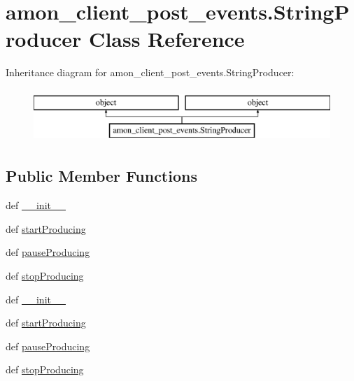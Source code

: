 \hypertarget{classamon__client__post__events_1_1_string_producer}{\section{amon\-\_\-client\-\_\-post\-\_\-events.\-String\-Producer Class Reference}
\label{classamon__client__post__events_1_1_string_producer}
}
Inheritance diagram for amon\-\_\-client\-\_\-post\-\_\-events.\-String\-Producer\-:\begin{figure}[H]
\begin{center}
\leavevmode
\includegraphics[height=2.000000cm]{d5/d48/classamon__client__post__events_1_1_string_producer}
\end{center}
\end{figure}
\subsection*{Public Member Functions}
\begin{DoxyCompactItemize}
\item 
def \hyperlink{classamon__client__post__events_1_1_string_producer_ac2908908965317f0faa0c7f362c1a209}{\-\_\-\-\_\-init\-\_\-\-\_\-}
\item 
def \hyperlink{classamon__client__post__events_1_1_string_producer_a48cf3f30df73ed98063f87edd0b65d31}{start\-Producing}
\item 
def \hyperlink{classamon__client__post__events_1_1_string_producer_aea46523df84eb5fdf9e002056bde4148}{pause\-Producing}
\item 
def \hyperlink{classamon__client__post__events_1_1_string_producer_ac21b83f98560eb605b6afa71d5ffb438}{stop\-Producing}
\item 
def \hyperlink{classamon__client__post__events_1_1_string_producer_ac2908908965317f0faa0c7f362c1a209}{\-\_\-\-\_\-init\-\_\-\-\_\-}
\item 
def \hyperlink{classamon__client__post__events_1_1_string_producer_a48cf3f30df73ed98063f87edd0b65d31}{start\-Producing}
\item 
def \hyperlink{classamon__client__post__events_1_1_string_producer_aea46523df84eb5fdf9e002056bde4148}{pause\-Producing}
\item 
def \hyperlink{classamon__client__post__events_1_1_string_producer_ac21b83f98560eb605b6afa71d5ffb438}{stop\-Producing}
\end{DoxyCompactItemize}
